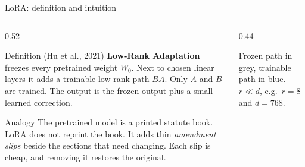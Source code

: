 \documentclass[aspectratio=169,11pt]{beamer}
\begin{document}
\begin{frame}{LoRA: definition and intuition}
  \begin{columns}[T]
    \begin{column}{0.52\textwidth}
      \begin{block}{Definition (Hu et al., 2021)}
        \small
        \textbf{Low-Rank Adaptation} freezes every pretrained weight $W_0$.
        Next to chosen linear layers it adds a trainable low-rank path $BA$.
        Only $A$ and $B$ are trained. The output is the frozen output plus a small learned correction.
      \end{block}
      \begin{exampleblock}{Analogy}
        \small
        The pretrained model is a printed statute book. LoRA does not reprint the book.
        It adds thin \emph{amendment slips} beside the sections that need changing.
        Each slip is cheap, and removing it restores the original.
      \end{exampleblock}
    \end{column}
    \begin{column}{0.44\textwidth}
      \centering
      \vspace{1mm}

      {\small Frozen path in grey, trainable path in blue. $r\ll d$, e.g.\ $r=8$ and $d=768$.}
    \end{column}
  \end{columns}
\end{frame}
\end{document}
